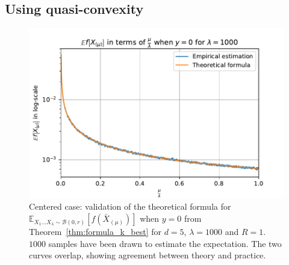 \subsection{Using quasi-convexity}\label{qc}
\begin{figure}[t]
    \centering
    \includegraphics[width=.45\textwidth]{sections/appendix/ppsn2020-kbest/imgs/fig_y=0}
    \caption{Centered case: validation of the theoretical formula for $\mathbb{E}_{X_1...X_\lambda\sim\mathcal{B}(0,r)}\left[ f(\bar X_{(\mu)})\right]$ when $y=0$ from Theorem~\ref{thm:formula_k_best} for $d=5$, $\lambda=1000$ and $R=1$. $1000$  samples have been drawn to estimate the expectation. {The two curves overlap, showing agreement between theory and practice.}}
    \label{fig:exp_th_c}
\end{figure}


